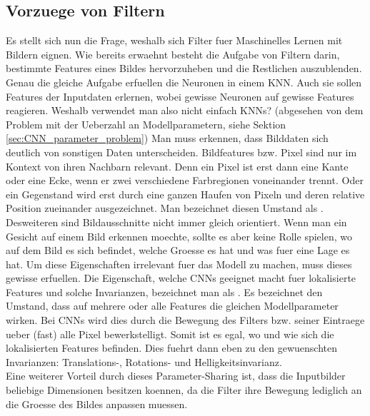 \cite{deeplearning.ai:cnn}

\subsection{Vorzuege von Filtern}
Es stellt sich nun die Frage, weshalb sich Filter fuer Maschinelles
Lernen mit Bildern eignen.
Wie bereits erwaehnt besteht die Aufgabe von Filtern darin, bestimmte Features
eines Bildes hervorzuheben und die Restlichen auszublenden. Genau die gleiche
Aufgabe erfuellen die Neuronen in einem KNN. Auch sie sollen Features der
Inputdaten erlernen, wobei gewisse Neuronen auf gewisse Features reagieren.
Weshalb verwendet man also nicht einfach KNNs? (abgesehen
von dem Problem mit der Ueberzahl an Modellparametern, siehe Sektion \ref{sec:CNN_parameter_problem})
\para{}
Man muss erkennen, dass Bilddaten sich deutlich von sonstigen Daten unterscheiden.
Bildfeatures bzw. Pixel sind nur im Kontext von ihren Nachbarn relevant. Denn
ein Pixel ist erst dann eine Kante oder eine Ecke, wenn er zwei verschiedene
Farbregionen voneinander trennt. Oder ein Gegenstand wird erst durch eine ganzen Haufen
von Pixeln und deren relative Position zueinander ausgezeichnet.
Man bezeichnet diesen Umstand als .
\para{}
Desweiteren sind Bildausschnitte nicht immer gleich
orientiert. Wenn man ein Gesicht auf einem Bild erkennen moechte, sollte es aber
keine Rolle spielen, wo auf dem Bild es sich befindet, welche Groesse es
hat und was fuer eine Lage es hat. Um diese Eigenschaften irrelevant fuer das
Modell zu machen, muss dieses gewisse  erfuellen.
\para{}
Die Eigenschaft, welche CNNs geeignet macht fuer lokalisierte Features und
solche Invarianzen, bezeichnet man als .
Es bezeichnet den Umstand, dass auf
mehrere oder alle Features die gleichen Modellparameter wirken. Bei CNNs wird
dies durch die Bewegung des Filters bzw. seiner Eintraege ueber (fast) alle
Pixel bewerkstelligt. Somit ist
es egal, wo und wie sich die lokalisierten Features befinden. Dies fuehrt dann eben zu
den gewuenschten Invarianzen: Translations-, Rotations- und
Helligkeitsinvarianz. \\
Eine weiterer Vorteil durch dieses Parameter-Sharing ist, dass die Inputbilder
beliebige Dimensionen besitzen koennen, da die Filter ihre Bewegung lediglich an
die Groesse des Bildes anpassen muessen.

\cite{deeplearning.ai:cnn}

